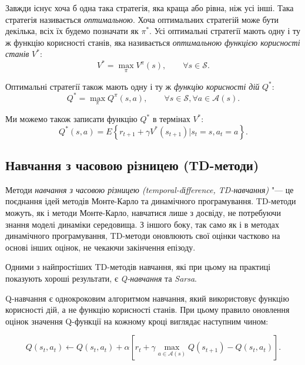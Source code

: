 \documentclass[a4paper,10pt,fleqn]{article}
\begin{document}
Завжди існує хоча б одна така стратегія, яка краща або рівна, ніж усі інші. Така стратегія називається \emph{оптимальною}. Хоча оптимальних стратегій може бути декілька, всіх їх будемо позначати як $\pi^*$. Усі оптимальні стратегії мають одну і ту ж функцію корисності станів, яка називається \emph{оптимальною функцією корисності станів} $V^*$:
\begin{equation}
V^* = \max_\pi V^\pi(s),\qquad \forall s \in \mathcal{S}.
\end{equation}

Оптимальні стратегії також мають одну і ту ж \emph{функцію корисності дій} $Q^*$:
\begin{equation}
Q^* = \max_\pi Q^\pi(s,a),\qquad \forall s \in \mathcal{S}, \forall a \in \mathcal{A}(s).
\end{equation}

Ми можемо також записати функцію $Q^*$ в термінах $V^*$:
\begin{equation}
Q^*(s,a) = E\left\{r_{t+1} + \gamma V^*(s_{t+1}) \Big| s_t=s, a_t=a \right\}.
\end{equation}

\subsection{Навчання з часовою різницею (TD-методи)}

Методи \emph{навчання з часовою різницею (temporal-dіfference, TD-навчання)} "--- це поєднання ідей методів Монте-Карло та динамічного програмування. TD-методи можуть, як і методи Монте-Карло, навчатися лише з досвіду, не потребуючи знання моделі динаміки середовища. З іншого боку, так само як і в методах динамічного програмування, TD-методи оновлюють свої оцінки частково на основі інших оцінок, не чекаючи закінчення епізоду.

Одними з найпростіших TD-методів навчання, які при цьому на практиці показують хороші результати, є \emph{Q-навчання} та \emph{Sarsa}.

Q-навчання є однокроковим алгоритмом навчання, який використовує функцію корисності дій, а не функцію корисності станів. При цьому правило оновлення оцінок значення Q-функції на кожному кроці виглядає наступним чином:

\begin{equation}
Q(s_t,a_t) \leftarrow Q(s_t, a_t) + \alpha \left[ r_t + \gamma \max_{a \in \mathcal{A}(s)} Q(s_{t+1}) - Q(s_t,a_t) \right].
\label{eq:q-update-rule}
\end{equation}
\end{document}
